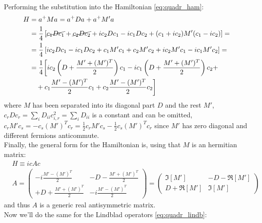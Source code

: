 \documentclass[a4paper,11pt]{article}
\begin{document}
   Performing the substitution into the Hamiltonian \ref{eq:quadr_ham}:
    \begin{align*}
     H &= a^+Ma^{ } = a^+Da^{ } + a^+M'a^{ }\notag\\
       &=\frac{1}{4}\left[\cancel{c_1Dc_1} + \cancel{c_2Dc_2} +ic_2Dc_1-ic_1Dc_2+(c_1+ic_2)M'(c_1-ic_2)\right] =  \notag\\
       &=\frac{1}{4}\left[ic_2Dc_1-ic_1Dc_2+c_1M'c_1 + c_2M'c_2 +ic_2M'c_1-ic_1M'c_2\right]=\notag \\
       &=\frac{1}{4}\bigg[ic_2\left(D+\frac{M'+(M')^T}{2}\right)c_1-ic_1\left(D+\frac{M'+(M')^T}{2}\right)c_2 +\notag\\
       &\ \ \ +c_1\frac{M'-(M')^T}{2}c_1+c_2\frac{M'-(M')^T}{2}c_2\bigg]\notag
    \end{align*}
    where $M$ has been separated into its diagonal part $D$ and the rest $\displaystyle M'$, $c_rDc_r = \sum_iD_{ii}c_{i,r}^2 = \sum_i D_{ii}$ is a constant and can be omitted, $\displaystyle c_rM'c_s = - c_s(M')^Tc_r = \frac{1}{2}c_rM'c_s - \frac{1}{2}c_s(M')^Tc_r$ since $M'$ has zero diagonal and different fermions anticommute.\\ Finally, the general form for the Hamiltonian is, using that $M$ is an hermitian matrix:
    \begin{subequations}
    \label{eq:quadr_ham_majorana}
    \begin{align}
     & H \equiv icAc\\
     & A = \left(
     \begin{array}{cc}
       -i\frac{M'-(M')^T}{2} & -D - \frac{M'+(M')^T}{2} \\
       + D + \frac{M'+(M')^T}{2} & -i \frac{M'-(M')^T}{2}
        \end{array}
        \right)
      =\left( 
      \begin{array}{cc}
        \Im[M'] & -D-\Re[M']\\
        D+\Re[M'] & \Im[M']
        \end{array}
        \right)
    \end{align}
    \end{subequations}
    and thus $A$ is a generic real antisymmetric matrix.\\[0.3cm] Now we'll do the same for the Lindblad operators \ref{eq:quadr_lindb}:
\end{document}
